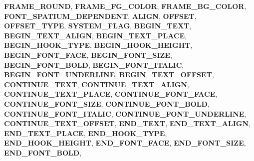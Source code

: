 \begin{DoxyCompactItemize}
{\bfseries F\+R\+A\+M\+E\+\_\+\+R\+O\+U\+ND}, 
{\bfseries F\+R\+A\+M\+E\+\_\+\+F\+G\+\_\+\+C\+O\+L\+OR}, 
{\bfseries F\+R\+A\+M\+E\+\_\+\+B\+G\+\_\+\+C\+O\+L\+OR}, 
{\bfseries F\+O\+N\+T\+\_\+\+S\+P\+A\+T\+I\+U\+M\+\_\+\+D\+E\+P\+E\+N\+D\+E\+NT}, 
\newline
{\bfseries A\+L\+I\+GN}, 
{\bfseries O\+F\+F\+S\+ET}, 
{\bfseries O\+F\+F\+S\+E\+T\+\_\+\+T\+Y\+PE}, 
{\bfseries S\+Y\+S\+T\+E\+M\+\_\+\+F\+L\+AG}, 
\newline
{\bfseries B\+E\+G\+I\+N\+\_\+\+T\+E\+XT}, 
{\bfseries B\+E\+G\+I\+N\+\_\+\+T\+E\+X\+T\+\_\+\+A\+L\+I\+GN}, 
{\bfseries B\+E\+G\+I\+N\+\_\+\+T\+E\+X\+T\+\_\+\+P\+L\+A\+CE}, 
{\bfseries B\+E\+G\+I\+N\+\_\+\+H\+O\+O\+K\+\_\+\+T\+Y\+PE}, 
\newline
{\bfseries B\+E\+G\+I\+N\+\_\+\+H\+O\+O\+K\+\_\+\+H\+E\+I\+G\+HT}, 
{\bfseries B\+E\+G\+I\+N\+\_\+\+F\+O\+N\+T\+\_\+\+F\+A\+CE}, 
{\bfseries B\+E\+G\+I\+N\+\_\+\+F\+O\+N\+T\+\_\+\+S\+I\+ZE}, 
{\bfseries B\+E\+G\+I\+N\+\_\+\+F\+O\+N\+T\+\_\+\+B\+O\+LD}, 
\newline
{\bfseries B\+E\+G\+I\+N\+\_\+\+F\+O\+N\+T\+\_\+\+I\+T\+A\+L\+IC}, 
{\bfseries B\+E\+G\+I\+N\+\_\+\+F\+O\+N\+T\+\_\+\+U\+N\+D\+E\+R\+L\+I\+NE}, 
{\bfseries B\+E\+G\+I\+N\+\_\+\+T\+E\+X\+T\+\_\+\+O\+F\+F\+S\+ET}, 
{\bfseries C\+O\+N\+T\+I\+N\+U\+E\+\_\+\+T\+E\+XT}, 
\newline
{\bfseries C\+O\+N\+T\+I\+N\+U\+E\+\_\+\+T\+E\+X\+T\+\_\+\+A\+L\+I\+GN}, 
{\bfseries C\+O\+N\+T\+I\+N\+U\+E\+\_\+\+T\+E\+X\+T\+\_\+\+P\+L\+A\+CE}, 
{\bfseries C\+O\+N\+T\+I\+N\+U\+E\+\_\+\+F\+O\+N\+T\+\_\+\+F\+A\+CE}, 
{\bfseries C\+O\+N\+T\+I\+N\+U\+E\+\_\+\+F\+O\+N\+T\+\_\+\+S\+I\+ZE}, 
\newline
{\bfseries C\+O\+N\+T\+I\+N\+U\+E\+\_\+\+F\+O\+N\+T\+\_\+\+B\+O\+LD}, 
{\bfseries C\+O\+N\+T\+I\+N\+U\+E\+\_\+\+F\+O\+N\+T\+\_\+\+I\+T\+A\+L\+IC}, 
{\bfseries C\+O\+N\+T\+I\+N\+U\+E\+\_\+\+F\+O\+N\+T\+\_\+\+U\+N\+D\+E\+R\+L\+I\+NE}, 
{\bfseries C\+O\+N\+T\+I\+N\+U\+E\+\_\+\+T\+E\+X\+T\+\_\+\+O\+F\+F\+S\+ET}, 
\newline
{\bfseries E\+N\+D\+\_\+\+T\+E\+XT}, 
{\bfseries E\+N\+D\+\_\+\+T\+E\+X\+T\+\_\+\+A\+L\+I\+GN}, 
{\bfseries E\+N\+D\+\_\+\+T\+E\+X\+T\+\_\+\+P\+L\+A\+CE}, 
{\bfseries E\+N\+D\+\_\+\+H\+O\+O\+K\+\_\+\+T\+Y\+PE}, 
\newline
{\bfseries E\+N\+D\+\_\+\+H\+O\+O\+K\+\_\+\+H\+E\+I\+G\+HT}, 
{\bfseries E\+N\+D\+\_\+\+F\+O\+N\+T\+\_\+\+F\+A\+CE}, 
{\bfseries E\+N\+D\+\_\+\+F\+O\+N\+T\+\_\+\+S\+I\+ZE}, 
{\bfseries E\+N\+D\+\_\+\+F\+O\+N\+T\+\_\+\+B\+O\+LD}, 
\newline

\end{DoxyCompactItemize}
